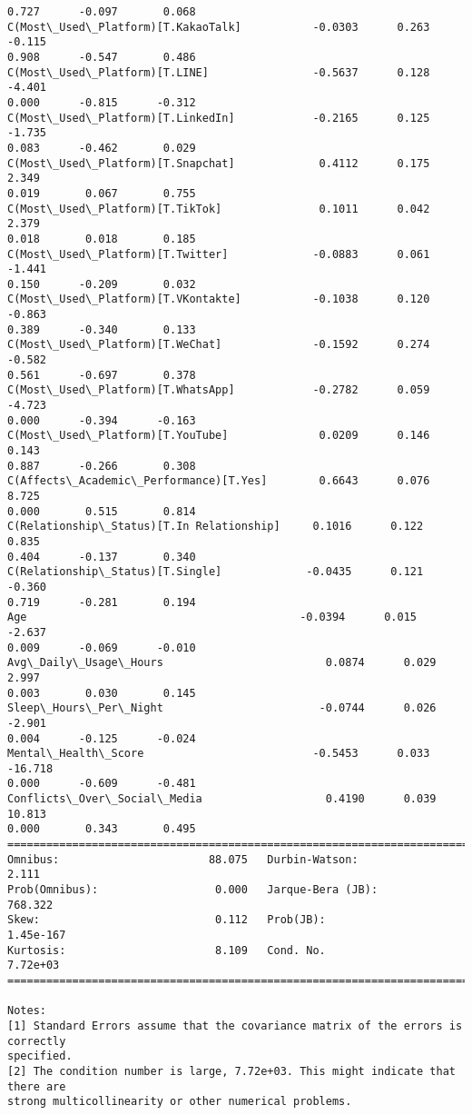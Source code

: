 \documentclass[11pt]{article}
\begin{document}
\begin{Verbatim}[commandchars=\\\{\}]
0.727      -0.097       0.068
C(Most\_Used\_Platform)[T.KakaoTalk]           -0.0303      0.263     -0.115
0.908      -0.547       0.486
C(Most\_Used\_Platform)[T.LINE]                -0.5637      0.128     -4.401
0.000      -0.815      -0.312
C(Most\_Used\_Platform)[T.LinkedIn]            -0.2165      0.125     -1.735
0.083      -0.462       0.029
C(Most\_Used\_Platform)[T.Snapchat]             0.4112      0.175      2.349
0.019       0.067       0.755
C(Most\_Used\_Platform)[T.TikTok]               0.1011      0.042      2.379
0.018       0.018       0.185
C(Most\_Used\_Platform)[T.Twitter]             -0.0883      0.061     -1.441
0.150      -0.209       0.032
C(Most\_Used\_Platform)[T.VKontakte]           -0.1038      0.120     -0.863
0.389      -0.340       0.133
C(Most\_Used\_Platform)[T.WeChat]              -0.1592      0.274     -0.582
0.561      -0.697       0.378
C(Most\_Used\_Platform)[T.WhatsApp]            -0.2782      0.059     -4.723
0.000      -0.394      -0.163
C(Most\_Used\_Platform)[T.YouTube]              0.0209      0.146      0.143
0.887      -0.266       0.308
C(Affects\_Academic\_Performance)[T.Yes]        0.6643      0.076      8.725
0.000       0.515       0.814
C(Relationship\_Status)[T.In Relationship]     0.1016      0.122      0.835
0.404      -0.137       0.340
C(Relationship\_Status)[T.Single]             -0.0435      0.121     -0.360
0.719      -0.281       0.194
Age                                          -0.0394      0.015     -2.637
0.009      -0.069      -0.010
Avg\_Daily\_Usage\_Hours                         0.0874      0.029      2.997
0.003       0.030       0.145
Sleep\_Hours\_Per\_Night                        -0.0744      0.026     -2.901
0.004      -0.125      -0.024
Mental\_Health\_Score                          -0.5453      0.033    -16.718
0.000      -0.609      -0.481
Conflicts\_Over\_Social\_Media                   0.4190      0.039     10.813
0.000       0.343       0.495
==============================================================================
Omnibus:                       88.075   Durbin-Watson:                   2.111
Prob(Omnibus):                  0.000   Jarque-Bera (JB):              768.322
Skew:                           0.112   Prob(JB):                    1.45e-167
Kurtosis:                       8.109   Cond. No.                     7.72e+03
==============================================================================

Notes:
[1] Standard Errors assume that the covariance matrix of the errors is correctly
specified.
[2] The condition number is large, 7.72e+03. This might indicate that there are
strong multicollinearity or other numerical problems.
    \end{Verbatim}
\end{document}
